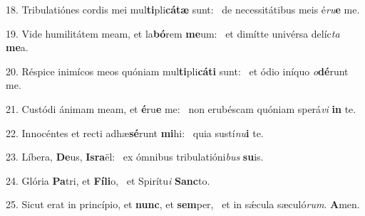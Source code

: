 18. Tribulatiónes cordis mei mul\textbf{ti}pli\textbf{cá}\textbf{tæ} sunt: \ast\  de necessitátibus meis é\textit{ru}\textbf{e} me.\

19. Vide humilitátem meam, et la\textbf{bó}rem \textbf{me}um: \ast\  et dimítte univérsa delíc\textit{ta} \textbf{me}a.\

20. Réspice inimícos meos quóniam mul\textbf{ti}pli\textbf{cá}\textbf{ti} sunt: \ast\  et ódio iníquo \textit{o}\textbf{dé}runt me.\

21. Custódi ánimam meam, et \textbf{é}ru\textbf{e} me: \ast\  non erubéscam quóniam sperá\textit{vi} \textbf{in} te.\

22. Innocéntes et recti adhæ\textbf{sé}runt \textbf{mi}hi: \ast\  quia sustí\textit{nu}\textbf{i} te.\

23. Líbera, \textbf{De}us, \textbf{Is}\textbf{ra}ël: \ast\  ex ómnibus tribulatióni\textit{bus} \textbf{su}is.\

24. Glória \textbf{Pa}tri, et \textbf{Fí}\textbf{li}o, \ast\  et Spirítu\textit{i} \textbf{Sanc}to.\

25. Sicut erat in princípio, et \textbf{nunc}, et \textbf{sem}per, \ast\  et in sǽcula sæculó\textit{rum}. \textbf{A}men.\

